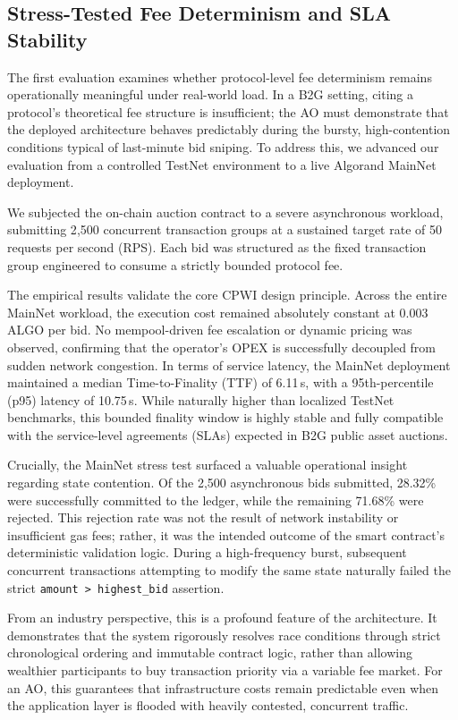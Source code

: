 \documentclass[runningheads]{llncs}
\begin{document}
\subsection{Stress-Tested Fee Determinism and SLA Stability}

The first evaluation examines whether protocol-level fee determinism remains operationally meaningful under real-world load. In a B2G setting, citing a protocol's theoretical fee structure is insufficient; the AO must demonstrate that the deployed architecture behaves predictably during the bursty, high-contention conditions typical of last-minute bid sniping. To address this, we advanced our evaluation from a controlled TestNet environment to a live Algorand MainNet deployment.

We subjected the on-chain auction contract to a severe asynchronous workload, submitting 2{,}500 concurrent transaction groups at a sustained target rate of 50 requests per second (RPS). Each bid was structured as the fixed transaction group engineered to consume a strictly bounded protocol fee. 

The empirical results validate the core CPWI design principle. Across the entire MainNet workload, the execution cost remained absolutely constant at 0.003 ALGO per bid. No mempool-driven fee escalation or dynamic pricing was observed, confirming that the operator's OPEX is successfully decoupled from sudden network congestion. In terms of service latency, the MainNet deployment maintained a median Time-to-Finality (TTF) of 6.11\,s, with a 95th-percentile (p95) latency of 10.75\,s. While naturally higher than localized TestNet benchmarks, this bounded finality window is highly stable and fully compatible with the service-level agreements (SLAs) expected in B2G public asset auctions.

Crucially, the MainNet stress test surfaced a valuable operational insight regarding state contention. Of the 2{,}500 asynchronous bids submitted, 28.32\% were successfully committed to the ledger, while the remaining 71.68\% were rejected. This rejection rate was not the result of network instability or insufficient gas fees; rather, it was the intended outcome of the smart contract's deterministic validation logic. During a high-frequency burst, subsequent concurrent transactions attempting to modify the same state naturally failed the strict \texttt{amount > highest\_bid} assertion. 

From an industry perspective, this is a profound feature of the architecture. It demonstrates that the system rigorously resolves race conditions through strict chronological ordering and immutable contract logic, rather than allowing wealthier participants to buy transaction priority via a variable fee market. For an AO, this guarantees that infrastructure costs remain predictable even when the application layer is flooded with heavily contested, concurrent traffic.
\end{document}
